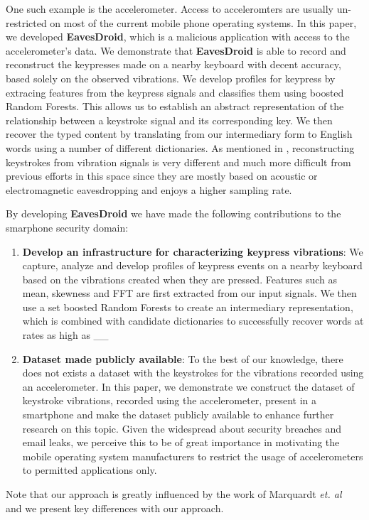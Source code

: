 \documentclass[11pt,conference]{IEEEtran}
\begin{document}
One such example is the accelerometer. Access to acceleromters are usually un-restricted on most of the current mobile phone operating systems. In this paper, we developed \textbf{EavesDroid}, which is a malicious application with access to the accelerometer's data. We demonstrate that \textbf{EavesDroid} is able to record and reconstruct the keypresses made on a nearby keyboard with decent accuracy, based solely on the observed vibrations. We develop profiles for keypress by extracing features from the keypress signals and classifies them using boosted Random Forests. This allows us to establish an abstract representation of the relationship between a keystroke signal and its corresponding key. We then recover the typed content
by translating from our intermediary form to English words using a number
of different dictionaries. As mentioned in \cite{spiphone}, reconstructing keystrokes from vibration signals is very different and much more difficult from previous efforts in this space since they are mostly based on acoustic or electromagnetic eavesdropping and enjoys a higher sampling rate. 

By developing \textbf{EavesDroid} we have made the following contributions to the smarphone security domain:
\begin{enumerate}
\item {\bf Develop an infrastructure for characterizing keypress vibrations}: We
capture, analyze and develop profiles of keypress events on a nearby
keyboard based on the vibrations created when they are pressed. Features such as mean, skewness and FFT are first extracted from our input signals. We then use a set boosted Random Forests to create an intermediary
representation, which is combined with candidate dictionaries
to successfully recover words at rates as high as \_\_ %
\item {\bf Dataset made publicly available}: To the best of our knowledge,
there does not exists a dataset with
the keystrokes for the vibrations recorded using an accelerometer. In this
paper, we demonstrate we construct the dataset of keystroke vibrations,
recorded using the accelerometer, present in a smartphone and make
the dataset publicly available to enhance further research on this topic. Given
the widespread about security breaches and email leaks, we perceive this to be
of great importance in motivating the mobile operating system manufacturers
to restrict the usage of accelerometers to permitted applications only.\\
\end{enumerate}
\noindent Note that our approach is greatly influenced by the work of
Marquardt \emph{et. al}~\cite{spiphone} and we present key differences with our
approach.
\end{document}
